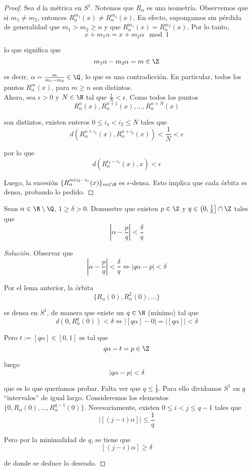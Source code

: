 \documentclass[	docname= Sistemas\ Din\'amicos,
				finished=1,
				semester=1,
				year=2017,
				professor=Godofredo\ Iommi,
				sigla=MAT2565]{apunte}
\begin{document}
\begin{proof} Sea $d$ la métrica en $S^{1}$. Notemos que $R_{\alpha}$ es una isometría. Observemos que si $m_{1} \neq m_{2}$, entonces $R_{\alpha}^{m_{1}}(x) \neq R_{\alpha}^{m_{2}}(x)$. En efecto, supongamos sin pérdida de generalidad que $m_{1} > m_{2} \geq n$ y que $R_{\alpha}^{m_{1}}(x) = R_{\alpha}^{m_{2}}(x)$. Por lo tanto,
	$$x + m_{1}\alpha = x + m_{2}\alpha		\mod 1$$

lo que significa que
	$$m_{1}\alpha - m_{2}\alpha = m \in \Z$$

es decir, $\alpha = \frac{m}{m_{1} - m_{2}} \in \Q$, lo que es una contradicción. En particular, todos los puntos $R^{m}_{\alpha}(x)$, para $m \geq n$ son distintos.	\\

Ahora, sea $\epsilon > 0$ y $N \in \N$ tal que $\frac{1}{N} < \epsilon$. Como todos los puntos
	$$R^{n}_{\alpha}(x), R^{n+1}_{\alpha}(x), \ldots, R^{n+N}_{\alpha}(x)$$

son distintos, existen enteros $0 \leq i_{1} < i_{2} \leq N$ tales que
	$$d(R^{n+i_{1}}_{\alpha}(x), R^{n+i_{2}}_{\alpha}(x)) < \frac{1}{N} < \epsilon$$

por lo que
	$$d(R_{\alpha}^{i_{2} - i_{1}}(x), x) < \epsilon$$

Luego, la sucesión $\{R_{\alpha}^{m(i_{2} - i_{1}}(x)\}_{m \in \N}$ es $\epsilon$-densa. Esto implica que cada órbita es densa, probando lo pedido.
\end{proof}

\begin{ej} Sean $\alpha \in \R \setminus \Q$, $1 \geq \delta > 0$. Demuestre que existen $p \in \Z$ y $q \in \left(0,\frac{1}{\delta}\right] \cap \Z$ tales que
	$$\left| \alpha - \frac{p}{q}\right| < \frac{\delta}{q}$$
\end{ej}

\begin{proof}[Solución] Observar que
	$$\left| \alpha - \frac{p}{q}\right| < \frac{\delta}{q}
		\Longleftrightarrow	|q\alpha - p| < \delta$$
	
Por el lema anterior, la órbita
	$$\{R_{\alpha}(0), R^{2}_{\alpha}(0), \ldots\}$$

es densa en $S^{1}$, de manera que existe un $q \in \N$ (mínimo) tal que
	$$d(0, R^{q}_{\alpha}(0)) < \delta
		\Longleftrightarrow | [q\alpha] - 0| = |[q\alpha]| < \delta$$

Pero $t := [q\alpha] \in [0,1]$ es tal que
	$$q\alpha - t = p \in \Z$$

luego
	$$|q\alpha - p| < \delta$$

que es lo que queríamos probar. Falta ver que $q \leq \frac{1}{\delta}$. Para ello dividamos $S^{1}$ en $q$ ``intervalos'' de igual largo. Consideremos los elementos $\{0, R_{\alpha}(0), \ldots, R_{\alpha}^{q-1}(0)\}$. Necesariamente, existen $0 \leq i < j \leq q-1$ tales que
	 $$|[(j-i)\alpha]| \leq \frac{1}{q}$$

Pero por la minimalidad de $q$, se tiene que
	$$[(j-i)\alpha] \geq \delta$$

de donde se deduce lo deseado.
\end{proof}
\end{document}

